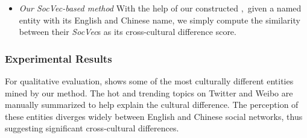 \begin{itemize}
\item \textit{Our SocVec-based method} With the help of our constructed \textit{\socvec},~given a named entity with its English and 
Chinese name, we simply compute the similarity between their 
\textit{SocVec}s as its cross-cultural difference score. 
\end{itemize}

\subsubsection{Experimental Results}

For qualitative evaluation,  shows some of 
the most culturally different entities mined by our method. 
The hot and trending topics on Twitter and Weibo are 
manually summarized to help explain the cultural difference. 
The perception of these entities diverges widely between English and
Chinese social networks, thus suggesting
significant cross-cultural differences.


